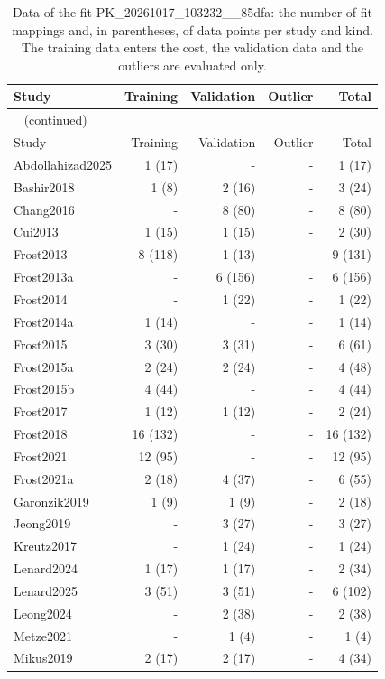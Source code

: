 \documentclass{article}
\begin{document}
\begin{longtable}{lrrrr}
\caption{Data of the fit PK\_20261017\_103232\_\_85dfa: the number of fit mappings and, in parentheses, of data points per study and kind. The training data enters the cost, the validation data and the outliers are evaluated only.}\label{tab:data:PK_20261017_103232__85dfa} \\
\toprule
Study & Training & Validation & Outlier & Total \\
\midrule
\endfirsthead
\multicolumn{5}{l}{\small\tablename~\thetable{} (continued)} \\
\toprule
Study & Training & Validation & Outlier & Total \\
\midrule
\endhead
\bottomrule
\endlastfoot
Abdollahizad2025 & 1 (17) & - & - & 1 (17) \\
Bashir2018 & 1 (8) & 2 (16) & - & 3 (24) \\
Chang2016 & - & 8 (80) & - & 8 (80) \\
Cui2013 & 1 (15) & 1 (15) & - & 2 (30) \\
Frost2013 & 8 (118) & 1 (13) & - & 9 (131) \\
Frost2013a & - & 6 (156) & - & 6 (156) \\
Frost2014 & - & 1 (22) & - & 1 (22) \\
Frost2014a & 1 (14) & - & - & 1 (14) \\
Frost2015 & 3 (30) & 3 (31) & - & 6 (61) \\
Frost2015a & 2 (24) & 2 (24) & - & 4 (48) \\
Frost2015b & 4 (44) & - & - & 4 (44) \\
Frost2017 & 1 (12) & 1 (12) & - & 2 (24) \\
Frost2018 & 16 (132) & - & - & 16 (132) \\
Frost2021 & 12 (95) & - & - & 12 (95) \\
Frost2021a & 2 (18) & 4 (37) & - & 6 (55) \\
Garonzik2019 & 1 (9) & 1 (9) & - & 2 (18) \\
Jeong2019 & - & 3 (27) & - & 3 (27) \\
Kreutz2017 & - & 1 (24) & - & 1 (24) \\
Lenard2024 & 1 (17) & 1 (17) & - & 2 (34) \\
Lenard2025 & 3 (51) & 3 (51) & - & 6 (102) \\
Leong2024 & - & 2 (38) & - & 2 (38) \\
Metze2021 & - & 1 (4) & - & 1 (4) \\
Mikus2019 & 2 (17) & 2 (17) & - & 4 (34) \\

\end{longtable}
\end{document}

